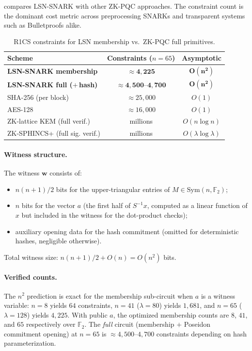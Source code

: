 \documentclass[11pt,a4paper]{article}
\theoremstyle{plain}
\theoremstyle{definition}
\newcommand{\F}{\mathbb{F}}
\begin{document}
 compares LSN-SNARK with other ZK-PQC approaches. The constraint count is the dominant cost metric across preprocessing SNARKs \cite{GGPR13,Gro16} and transparent systems such as Bulletproofs \cite{BBB+18} alike.

\begin{table}[ht]
\centering
\caption{R1CS constraints for LSN membership vs.~ZK-PQC full primitives.}
\label{tab:r1cs}
{\small\begin{tabular}{@{}lcc@{}}
\hline
Scheme & Constraints ($n=65$) & Asymptotic \\
\hline
\textbf{LSN-SNARK membership} & $\mathbf{\approx 4{,}225}$ & $\mathbf{O(n^2)}$ \\
\textbf{LSN-SNARK full ($+\,$hash)} & $\mathbf{\approx 4{,}500}$--$\mathbf{4{,}700}$ & $\mathbf{O(n^2)}$ \\
SHA-256 (per block) & $\approx 25{,}000$ & $O(1)$ \\
AES-128 & $\approx 16{,}000$ & $O(1)$ \\
ZK-lattice KEM (full verif.) & millions & $O(n \log n)$ \\
ZK-SPHINCS+ (full sig. verif.) & millions & $O(\lambda \log \lambda)$ \\
\hline
\end{tabular}}
\end{table}

\paragraph{Witness structure.} The witness $\mathbf{w}$ consists of:
\begin{itemize}
\item $n(n+1)/2$ bits for the upper-triangular entries of $M \in \mathrm{Sym}(n,\F_2)$;
\item $n$ bits for the vector $a$ (the first half of $S^{-1}x$, computed as a linear function of $x$ but included in the witness for the dot-product checks);
\item auxiliary opening data for the hash commitment (omitted for deterministic hashes, negligible otherwise).
\end{itemize}
Total witness size: $n(n+1)/2 + O(n) = O(n^2)$ bits.

\paragraph{Verified counts.}
The $n^2$ prediction is exact for the membership sub-circuit when $a$ is a witness variable: $n=8$ yields $64$ constraints, $n=41$ ($\lambda{=}80$) yields $1{,}681$, and $n=65$ ($\lambda{=}128$) yields $4{,}225$. With public $a$, the optimized membership counts are $8$, $41$, and $65$ respectively over $\F_2$. The \emph{full} circuit (membership $+$ Poseidon commitment opening) at $n=65$ is $\approx 4{,}500$--$4{,}700$ constraints depending on hash parameterization.
\end{document}
